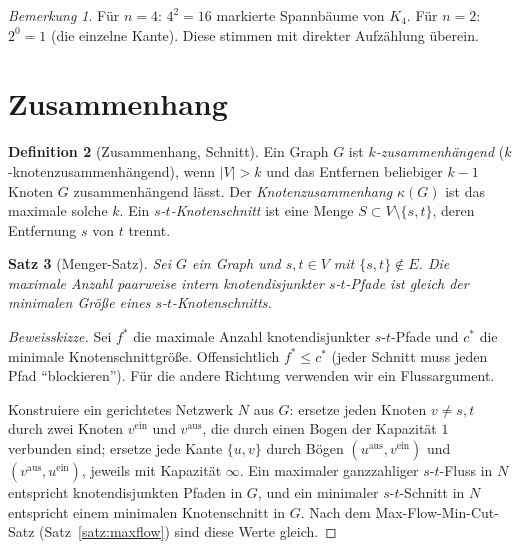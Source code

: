 \documentclass[12pt,a4paper]{amsart}
\newtheorem{theorem}{Satz}[section]
\theoremstyle{definition}
\newtheorem{definition}[theorem]{Definition}
\theoremstyle{remark}
\newtheorem{remark}[theorem]{Bemerkung}
\begin{document}
\begin{remark}
Für $n = 4$: $4^2 = 16$ markierte Spannbäume von $K_4$. Für $n = 2$: $2^0 = 1$
(die einzelne Kante). Diese stimmen mit direkter Aufzählung überein.
\end{remark}

\section{Zusammenhang}
\label{sec:zusammenhang}

\begin{definition}[Zusammenhang, Schnitt]
Ein Graph $G$ ist \emph{$k$-zusammenhängend} ($k$-knotenzusammenhängend),
wenn $|V| > k$ und das Entfernen beliebiger $k-1$ Knoten $G$ zusammenhängend
lässt. Der \emph{Knotenzusammenhang} $\kappa(G)$ ist das maximale solche $k$.
Ein \emph{$s$-$t$-Knotenschnitt} ist eine Menge $S \subset V \setminus \{s,t\}$,
deren Entfernung $s$ von $t$ trennt.
\end{definition}

\begin{theorem}[Menger-Satz]
\label{satz:menger}
Sei $G$ ein Graph und $s, t \in V$ mit $\{s,t\} \notin E$. Die maximale Anzahl
paarweise intern knotendisjunkter $s$-$t$-Pfade ist gleich der minimalen Größe
eines $s$-$t$-Knotenschnitts.
\end{theorem}

\begin{proof}[Beweisskizze]
Sei $f^*$ die maximale Anzahl knotendisjunkter $s$-$t$-Pfade und $c^*$ die
minimale Knotenschnittgröße. Offensichtlich $f^* \le c^*$ (jeder Schnitt
muss jeden Pfad ``blockieren''). Für die andere Richtung verwenden wir ein
Flussargument.

Konstruiere ein gerichtetes Netzwerk $N$ aus $G$: ersetze jeden Knoten
$v \ne s, t$ durch zwei Knoten $v^{\text{ein}}$ und $v^{\text{aus}}$, die
durch einen Bogen der Kapazität $1$ verbunden sind; ersetze jede Kante
$\{u,v\}$ durch Bögen $(u^{\text{aus}}, v^{\text{ein}})$ und
$(v^{\text{aus}}, u^{\text{ein}})$, jeweils mit Kapazität $\infty$. Ein
maximaler ganzzahliger $s$-$t$-Fluss in $N$ entspricht knotendisjunkten
Pfaden in $G$, und ein minimaler $s$-$t$-Schnitt in $N$ entspricht einem
minimalen Knotenschnitt in $G$. Nach dem Max-Flow-Min-Cut-Satz
(Satz~\ref{satz:maxflow}) sind diese Werte gleich.
\end{proof}
\end{document}
